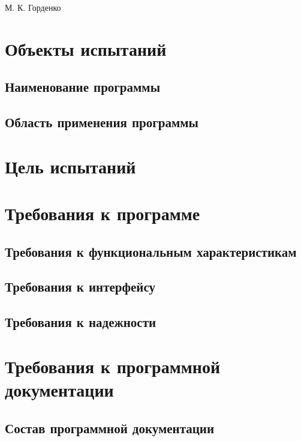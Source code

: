 \documentclass[a4paper,12pt]{article}
\begin{document}
	
	{М. К. Горденко}
	
	\firstPage
	\newpage
	\secondPage
	\newpage
	\thirdPage
	\newpage
	
	\section{Объекты испытаний}
	\subsection{Наименование программы}
	\subsection{Область применения программы}
	
					\newpage
	\section{Цель испытаний}
	
					\newpage 
	\section{Требования к программе}
	\subsection{Требования к функциональным характеристикам}
	\subsection{Требования к интерфейсу}
	\subsection{Требования к надежности}
	
						\newpage
	\section{Требования к программной документации}
	\subsection{Состав программной документации}
	
\end{document}
